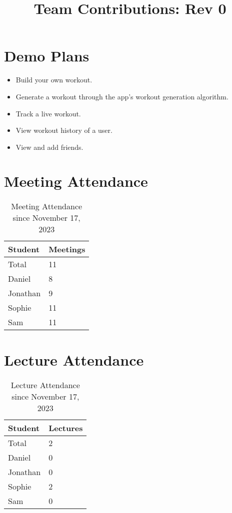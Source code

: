 \documentclass{article}
\title{Team Contributions: Rev 0\\\progname}
\author{\authname}
\date{}
\begin{document}
\maketitle

\section{Demo Plans}

\begin{itemize}
    \item Build your own workout.
    \item Generate a workout through the app's workout generation algorithm.
    \item Track a live workout.
    \item View workout history of a user.
    \item View and add friends.
\end{itemize}

\section{Meeting Attendance}

\begin{table}[H]
\centering
\begin{tabular}{ll}
\toprule
\textbf{Student} & \textbf{Meetings}\\
\midrule
Total & 11\\
Daniel & 8\\
Jonathan & 9\\
Sophie & 11\\
Sam & 11\\
\bottomrule
\end{tabular}
\caption{Meeting Attendance since November 17, 2023}
\end{table}

\section{Lecture Attendance}

\begin{table}[H]
\centering
\begin{tabular}{ll}
\toprule
\textbf{Student} & \textbf{Lectures}\\
\midrule
Total & 2\\
Daniel & 0\\
Jonathan & 0\\
Sophie & 2\\
Sam & 0\\
\bottomrule
\end{tabular}
\caption{Lecture Attendance since November 17, 2023}
\end{table}
\end{document}
